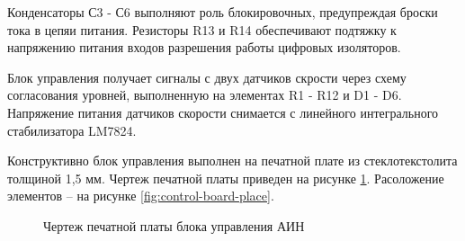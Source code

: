         Конденсаторы С3 - С6 выполняют роль блокировочных, предупреждая броски
        тока в цепяи питания. Резисторы R13 и R14 обеспечивают подтяжку к
        напряжению питания входов разрешения работы цифровых изоляторов.

        Блок управления получает сигналы с двух датчиков скрости через схему
        согласования уровней, выполненную на элементах R1 - R12 и D1 - D6.
        Напряжение питания датчиков скорости снимается с линейного
        интегрального стабилизатора LM7824.

        Конструктивно блок управления выполнен на печатной плате из
        стеклотекстолита толщиной 1,5 мм. Чертеж печатной платы приведен на
        рисунке \ref{fig:control-board-route}. Расоложение элементов -- на
        рисунке \ref{fig:control-board-place}.

        \begin{figure}[h!]
            \caption{Чертеж печатной платы блока управления АИН}
            \label{fig:control-board-route}
        \end{figure}

